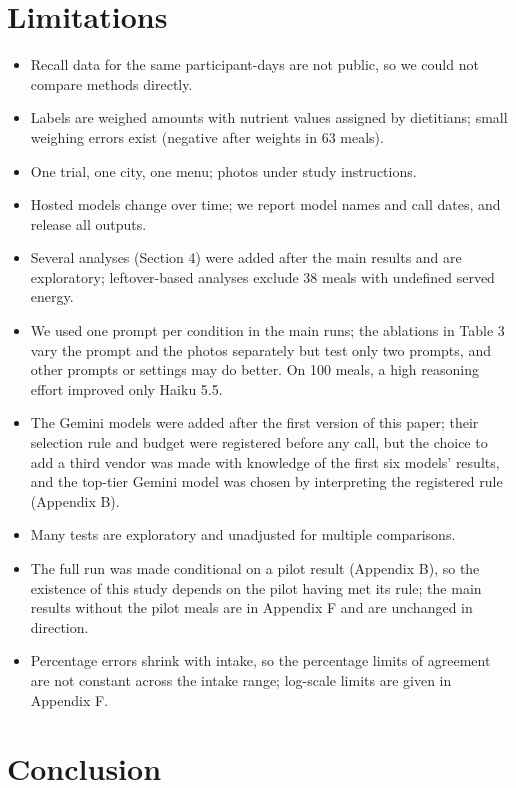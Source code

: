 \documentclass[
  11pt,
  letterpaper]{article}
\providecommand{\tightlist}{%
  \setlength{\itemsep}{0pt}\setlength{\parskip}{0pt}}
\begin{document}
\section{Limitations}\label{limitations}

\begin{itemize}
\tightlist
\item
  Recall data for the same participant-days are not public, so we could not compare methods directly.
\item
  Labels are weighed amounts with nutrient values assigned by dietitians; small weighing errors exist
  (negative after weights in 63 meals).
\item
  One trial, one city, one menu; photos under study instructions.
\item
  Hosted models change over time; we report model names and call dates, and release all outputs.
\item
  Several analyses (Section 4) were added after the main results and are exploratory; leftover-based analyses
  exclude 38 meals with undefined served energy.
\item
  We used one prompt per condition in the main runs; the ablations in Table 3 vary the prompt and the photos
  separately but test only two prompts, and other prompts or settings may do better. On 100 meals, a high
  reasoning effort improved only Haiku 5.5.
\item
  The Gemini models were added after the first version of this paper; their selection rule and budget were
  registered before any call, but the choice to add a third vendor was made with knowledge of the first six
  models' results, and the top-tier Gemini model was chosen by interpreting the registered rule (Appendix B).
\item
  Many tests are exploratory and unadjusted for multiple comparisons.
\item
  The full run was made conditional on a pilot result (Appendix B), so the existence of this study depends on
  the pilot having met its rule; the main results without the pilot meals are in Appendix F and are unchanged
  in direction.
\item
  Percentage errors shrink with intake, so the percentage limits of agreement are not constant across the
  intake range; log-scale limits are given in Appendix F.
\end{itemize}

\section{Conclusion}\label{conclusion}
\end{document}
